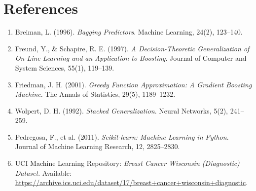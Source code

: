 \documentclass[12pt,a4paper]{article}
\begin{document}
\section*{References}
\begin{enumerate}
    \item Breiman, L. (1996). \textit{Bagging Predictors}. Machine Learning, 24(2), 123--140.
    \item Freund, Y., \& Schapire, R. E. (1997). \textit{A Decision-Theoretic Generalization of On-Line Learning and an Application to Boosting}. Journal of Computer and System Sciences, 55(1), 119--139.
    \item Friedman, J. H. (2001). \textit{Greedy Function Approximation: A Gradient Boosting Machine}. The Annals of Statistics, 29(5), 1189--1232.
    \item Wolpert, D. H. (1992). \textit{Stacked Generalization}. Neural Networks, 5(2), 241--259.
    \item Pedregosa, F., et al. (2011). \textit{Scikit-learn: Machine Learning in Python}. Journal of Machine Learning Research, 12, 2825--2830.
    \item UCI Machine Learning Repository: \textit{Breast Cancer Wisconsin (Diagnostic) Dataset}. Available: \url{https://archive.ics.uci.edu/dataset/17/breast+cancer+wisconsin+diagnostic}.
\end{enumerate}
\end{document}
